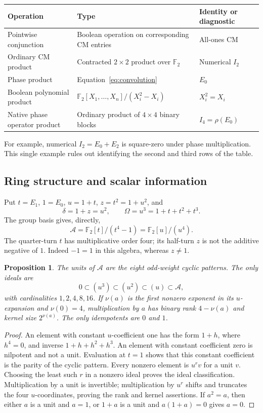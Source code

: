 \documentclass[11pt,a4paper]{article}
\newtheorem{proposition}[theorem]{Proposition}
\theoremstyle{definition}\newtheorem{definition}[theorem]{Definition}
\theoremstyle{remark}\newtheorem{remark}[theorem]{Remark}
\newcommand{\F}{\mathbb F}
\newcommand{\A}{\mathcal A}
\numberwithin{equation}{section}
\begin{document}
\begin{center}\small
\begin{tabularx}{\linewidth}{@{}L{.22\linewidth}Y L{.24\linewidth}@{}}\toprule
Operation & Type & Identity or diagnostic\\\midrule
Pointwise conjunction & Boolean operation on corresponding CM entries & All-ones CM\\
Ordinary CM product & Contracted $2\times2$ product over $\F_2$ & Numerical $I_2$\\
Phase product & Equation~\eqref{eq:convolution} & $E_0$\\
Boolean polynomial product & $\F_2[X_1,\ldots,X_n]/(X_i^2-X_i)$ & $X_i^2=X_i$\\
Native phase operator product & Ordinary product of $4\times4$ binary blocks & $I_4=\rho(E_0)$\\\bottomrule
\end{tabularx}
\end{center}
For example, numerical $I_2=E_0+E_2$ is square-zero under phase multiplication. This single example rules out identifying the second and third rows of the table.

\subsection{Ring structure and scalar information}
Put $t=E_1$, $1=E_0$, $u=1+t$, $z=t^2=1+u^2$, and
\[
 \delta=1+z=u^2,\qquad \Omega=u^3=1+t+t^2+t^3.
\]
The group basis gives, directly,
\begin{equation}\label{eq:ring}
 \A=\F_2[t]/(t^4-1)=\F_2[u]/(u^4).
\end{equation}
The quarter-turn $t$ has multiplicative order four; its half-turn $z$ is not the additive negative of $1$. Indeed $-1=1$ in this algebra, whereas $z\ne1$.

\begin{proposition}\label{prop:ring}
The units of $\A$ are the eight odd-weight cyclic patterns. The only ideals are
\[
 0\subset(u^3)\subset(u^2)\subset(u)\subset\A,
\]
with cardinalities $1,2,4,8,16$. If $\nu(a)$ is the first nonzero exponent in its $u$-expansion and $\nu(0)=4$, multiplication by $a$ has binary rank $4-\nu(a)$ and kernel size $2^{\nu(a)}$. The only idempotents are $0$ and $1$.
\end{proposition}
\begin{proof}
An element with constant $u$-coefficient one has the form $1+h$, where $h^4=0$, and inverse $1+h+h^2+h^3$. An element with constant coefficient zero is nilpotent and not a unit. Evaluation at $t=1$ shows that this constant coefficient is the parity of the cyclic pattern. Every nonzero element is $u^r v$ for a unit $v$. Choosing the least such $r$ in a nonzero ideal proves the ideal classification. Multiplication by a unit is invertible; multiplication by $u^r$ shifts and truncates the four $u$-coordinates, proving the rank and kernel assertions. If $a^2=a$, then either $a$ is a unit and $a=1$, or $1+a$ is a unit and $a(1+a)=0$ gives $a=0$.
\end{proof}
\end{document}
